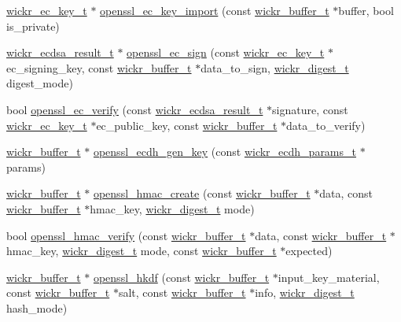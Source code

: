 \begin{DoxyCompactItemize}
\item 
\hyperlink{structwickr__ec__key}{wickr\+\_\+ec\+\_\+key\+\_\+t} $\ast$ \hyperlink{group__openssl__crypto_gab2cc137ada900eba89796857603cd8cd}{openssl\+\_\+ec\+\_\+key\+\_\+import} (const \hyperlink{structwickr__buffer}{wickr\+\_\+buffer\+\_\+t} $\ast$buffer, bool is\+\_\+private)
\item 
\hyperlink{structwickr__ecdsa__result}{wickr\+\_\+ecdsa\+\_\+result\+\_\+t} $\ast$ \hyperlink{group__openssl__crypto_gab32cef5c789ee1992afae98a81b65823}{openssl\+\_\+ec\+\_\+sign} (const \hyperlink{structwickr__ec__key}{wickr\+\_\+ec\+\_\+key\+\_\+t} $\ast$ec\+\_\+signing\+\_\+key, const \hyperlink{structwickr__buffer}{wickr\+\_\+buffer\+\_\+t} $\ast$data\+\_\+to\+\_\+sign, \hyperlink{structwickr__digest}{wickr\+\_\+digest\+\_\+t} digest\+\_\+mode)
\item 
bool \hyperlink{group__openssl__crypto_ga1e2b3f17c67e97360b616d0d673767f7}{openssl\+\_\+ec\+\_\+verify} (const \hyperlink{structwickr__ecdsa__result}{wickr\+\_\+ecdsa\+\_\+result\+\_\+t} $\ast$signature, const \hyperlink{structwickr__ec__key}{wickr\+\_\+ec\+\_\+key\+\_\+t} $\ast$ec\+\_\+public\+\_\+key, const \hyperlink{structwickr__buffer}{wickr\+\_\+buffer\+\_\+t} $\ast$data\+\_\+to\+\_\+verify)
\item 
\hyperlink{structwickr__buffer}{wickr\+\_\+buffer\+\_\+t} $\ast$ \hyperlink{group__openssl__crypto_gaa9e626d984efe7fed046d5f62c6c24a4}{openssl\+\_\+ecdh\+\_\+gen\+\_\+key} (const \hyperlink{structwickr__ecdh__params}{wickr\+\_\+ecdh\+\_\+params\+\_\+t} $\ast$params)
\item 
\hyperlink{structwickr__buffer}{wickr\+\_\+buffer\+\_\+t} $\ast$ \hyperlink{group__openssl__crypto_gaeb4574976214a17eb79bbc3d76f573a6}{openssl\+\_\+hmac\+\_\+create} (const \hyperlink{structwickr__buffer}{wickr\+\_\+buffer\+\_\+t} $\ast$data, const \hyperlink{structwickr__buffer}{wickr\+\_\+buffer\+\_\+t} $\ast$hmac\+\_\+key, \hyperlink{structwickr__digest}{wickr\+\_\+digest\+\_\+t} mode)
\item 
bool \hyperlink{group__openssl__crypto_gafbde176ef6f2b99ff9dab58ad69a9a74}{openssl\+\_\+hmac\+\_\+verify} (const \hyperlink{structwickr__buffer}{wickr\+\_\+buffer\+\_\+t} $\ast$data, const \hyperlink{structwickr__buffer}{wickr\+\_\+buffer\+\_\+t} $\ast$hmac\+\_\+key, \hyperlink{structwickr__digest}{wickr\+\_\+digest\+\_\+t} mode, const \hyperlink{structwickr__buffer}{wickr\+\_\+buffer\+\_\+t} $\ast$expected)
\item 
\hyperlink{structwickr__buffer}{wickr\+\_\+buffer\+\_\+t} $\ast$ \hyperlink{group__openssl__crypto_ga788a03002d8c6048401cf0bbc2d48c7a}{openssl\+\_\+hkdf} (const \hyperlink{structwickr__buffer}{wickr\+\_\+buffer\+\_\+t} $\ast$input\+\_\+key\+\_\+material, const \hyperlink{structwickr__buffer}{wickr\+\_\+buffer\+\_\+t} $\ast$salt, const \hyperlink{structwickr__buffer}{wickr\+\_\+buffer\+\_\+t} $\ast$info, \hyperlink{structwickr__digest}{wickr\+\_\+digest\+\_\+t} hash\+\_\+mode)

\end{DoxyCompactItemize}
